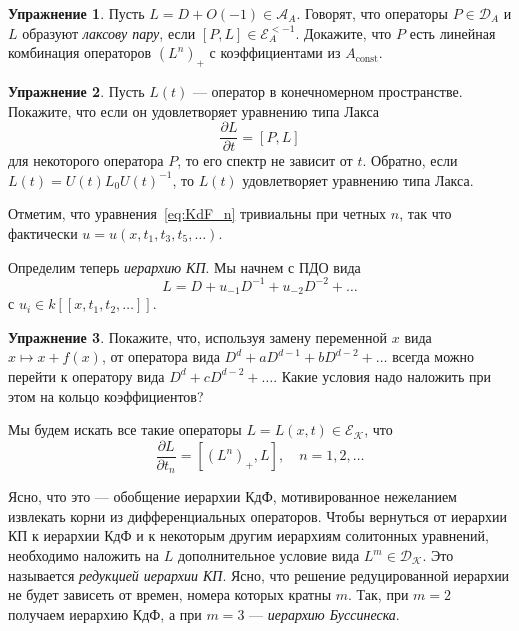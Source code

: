 \documentclass{article}
\theoremstyle{definition}
\theoremstyle{definition} %
\theoremstyle{remark}     %
\theoremstyle{definition}
\theoremstyle{definition}
\theoremstyle{definition}
\theoremstyle{definition}
\theoremstyle{definition}
\theoremstyle{definition}
\theoremstyle{definition}
\theoremstyle{definition}
\newtheorem{exercise}{Упражнение}[section]
\begin{document}
\begin{exercise} Пусть \(L = D + O(-1) \in \mathcal{A}_A\). Говорят, что операторы \(P \in \mathcal{D}_A\) и \(L\) образуют \textit{лаксову пару}, если \([P, L] \in \mathcal{E}_A^{<-1}\). Докажите, что \(P\) есть линейная комбинация операторов \((L^n)_+\) с коэффициентами из \(A_{\text{const}}\).
\end{exercise}

\begin{exercise} Пусть \(L(t)\) — оператор в конечномерном пространстве. Покажите, что если он удовлетворяет уравнению типа Лакса
\[
\frac{\partial L}{\partial t} = [P, L]
\]
для некоторого оператора \(P\), то его спектр не зависит от \(t\). Обратно, если \(L(t) = U(t)L_0U(t)^{-1}\), то \(L(t)\) удовлетворяет уравнению типа Лакса.
\end{exercise}

Отметим, что уравнения~\ref{eq:KdF_n} тривиальны при четных \(n\), так что фактически \(u = u(x, t_1, t_3, t_5, \dots)\).

Определим теперь \textit{иерархию КП}. Мы начнем с ПДО вида
\[
L = D + u_{-1}D^{-1} + u_{-2}D^{-2} + \dots
\]
с \(u_i \in k[[x, t_1, t_2, \dots]]\).



\begin{exercise}
Покажите, что, используя замену переменной \(x\) вида \(x \mapsto x + f(x)\), от оператора вида \(D^d + aD^{d-1} + bD^{d-2} + \dots\) всегда можно перейти к оператору вида \(D^d + cD^{d-2} + \dots\). Какие условия надо наложить при этом на кольцо коэффициентов?
\end{exercise}

Мы будем искать все такие операторы \(L = L(x, t) \in \mathcal{E}_\mathcal{K}\), что
\begin{equation*}\label{eq:KP_n}
\frac{\partial L}{\partial t_n} = [(L^n)_+, L], \quad n = 1, 2, \dots \tag*{(КП)$_n$} 
\end{equation*}

Ясно, что это — обобщение иерархии КдФ, мотивированное нежеланием извлекать корни из дифференциальных операторов. Чтобы вернуться от иерархии КП к иерархии КдФ и к некоторым другим иерархиям солитонных уравнений, необходимо наложить на \(L\) дополнительное условие вида \(L^m \in \mathcal{D}_{\mathcal{K}}\). Это называется \emph{редукцией иерархии КП}. Ясно, что решение редуцированной иерархии не будет зависеть от времен, номера которых кратны \(m\). Так, при \(m = 2\) получаем иерархию КдФ, а при \(m = 3\) — \emph{иерархию Буссинеска}.
\end{document}
